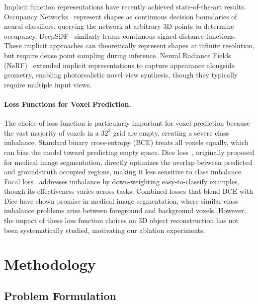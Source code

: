 \documentclass[10pt,twocolumn,letterpaper]{article}
\begin{document}
Implicit function representations have recently achieved state-of-the-art results. Occupancy Networks~\cite{mescheder2019occupancy} represent shapes as continuous decision boundaries of neural classifiers, querying the network at arbitrary 3D points to determine occupancy. DeepSDF~\cite{park2019deepsdf} similarly learns continuous signed distance functions. These implicit approaches can theoretically represent shapes at infinite resolution, but require dense point sampling during inference. Neural Radiance Fields (NeRF)~\cite{mildenhall2020nerf} extended implicit representations to capture appearance alongside geometry, enabling photorealistic novel view synthesis, though they typically require multiple input views.

\paragraph{Loss Functions for Voxel Prediction.}
The choice of loss function is particularly important for voxel prediction because the vast majority of voxels in a $32^3$ grid are empty, creating a severe class imbalance. Standard binary cross-entropy (BCE) treats all voxels equally, which can bias the model toward predicting empty space. Dice loss~\cite{milletari2016vnet}, originally proposed for medical image segmentation, directly optimizes the overlap between predicted and ground-truth occupied regions, making it less sensitive to class imbalance. Focal loss~\cite{lin2017focal} addresses imbalance by down-weighting easy-to-classify examples, though its effectiveness varies across tasks. Combined losses that blend BCE with Dice have shown promise in medical image segmentation, where similar class imbalance problems arise between foreground and background voxels. However, the impact of these loss function choices on 3D object reconstruction has not been systematically studied, motivating our ablation experiments.

\section{Methodology}
\label{sec:method}

\subsection{Problem Formulation}
\end{document}
